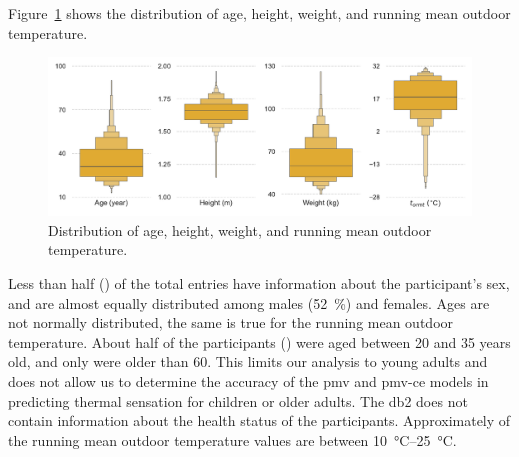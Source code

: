 Figure~\ref{fig:dist_other_data} shows the distribution of age, height, weight, and running mean outdoor temperature.
\begin{figure}[htb!]
    \centering
    \includegraphics[width=\textwidth]{figures/dist_other_data}
    \caption{Distribution of age, height, weight, and running mean outdoor temperature.}
    \label{fig:dist_other_data}
\end{figure}
Less than half () of the total entries have information about the participant's sex, and are almost equally distributed among males (\qty{52}{\percent}) and females.
Ages are not normally distributed, the same is true for the running mean outdoor temperature.
About half of the participants () were aged between \num{20} and \num{35} years old, and only  were older than 60.
This limits our analysis to young adults and does not allow us to determine the accuracy of the \ac{pmv} and \ac{pmv-ce} models in predicting thermal sensation for children or older adults.
The \ac{db2} does not contain information about the health status of the participants.
Approximately  of the running mean outdoor temperature values are between \qtyrange{10}{25}{\celsius}.

